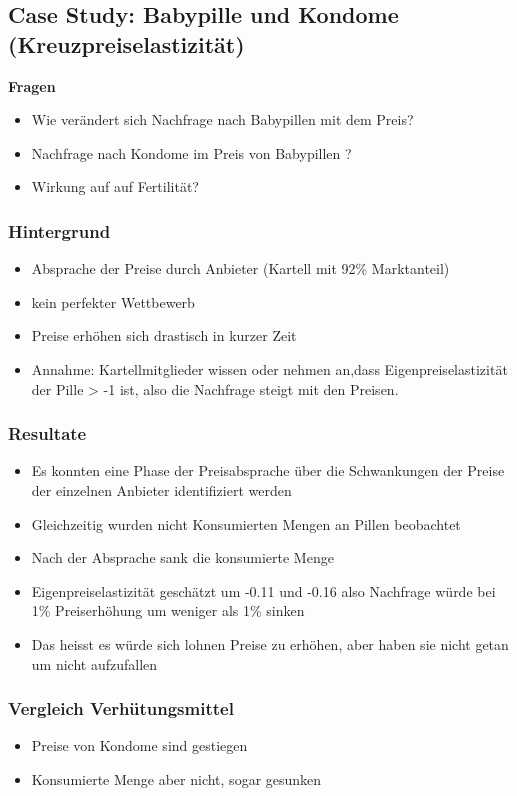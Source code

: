 \subsection{Case Study: Babypille und Kondome (Kreuzpreiselastizität)}
\textbf{Fragen}
\begin{itemize}
    \item Wie verändert sich Nachfrage nach Babypillen mit dem Preis?
    \item Nachfrage nach Kondome im Preis von Babypillen ?
    \item Wirkung auf auf Fertilität?
\end{itemize}

\subsubsection{Hintergrund}
\begin{itemize}
    \item Absprache der Preise durch Anbieter (Kartell mit 92\% Marktanteil)
    \item kein perfekter Wettbewerb
    \item Preise erhöhen sich drastisch in kurzer Zeit
    \item Annahme: Kartellmitglieder wissen oder nehmen an,dass Eigenpreiselastizität der Pille > -1 ist, also die Nachfrage steigt mit den Preisen.
\end{itemize}


\subsubsection{Resultate}
\begin{itemize}
    \item Es konnten eine Phase der Preisabsprache über die Schwankungen der Preise der einzelnen Anbieter identifiziert werden
    \item Gleichzeitig wurden nicht Konsumierten Mengen an Pillen beobachtet
    \item Nach der Absprache sank die konsumierte Menge
    \item Eigenpreiselastizität geschätzt um -0.11 und -0.16 also Nachfrage würde bei 1\% Preiserhöhung um weniger als 1\% sinken
    \item Das heisst es würde sich lohnen Preise zu erhöhen, aber haben sie nicht getan um nicht aufzufallen
\end{itemize}

\subsubsection{Vergleich Verhütungsmittel}

\begin{itemize}
    \item Preise von Kondome sind gestiegen
    \item Konsumierte Menge aber nicht, sogar gesunken
\end{itemize}